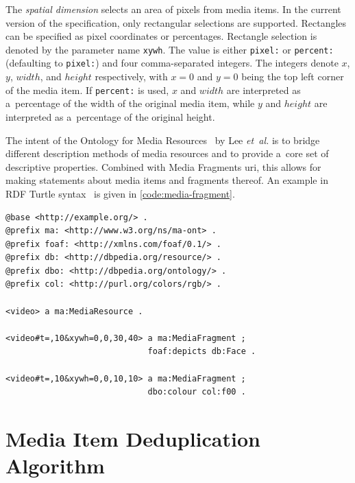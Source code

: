 \documentclass{article}
\begin{document}
The \emph{spatial dimension} selects an area of pixels from media items.
In the current version of the specification,
only rectangular selections are supported.
Rectangles can be specified as pixel coordinates or percentages.
Rectangle selection is denoted by the parameter name \texttt{xywh}.
The value is either \texttt{pixel:} or \texttt{percent:}
(defaulting to \texttt{pixel:}) and four comma-separated integers.
The integers denote $ x $, $ y $, $ width $, and $ height $ respectively,
with $ x = 0 $ and $ y = 0 $ being the top left corner of the media item.
If \texttt{percent:} is used,
$ x $ and $ width $ are interpreted as a~percentage
of the width of the original media item,
while $ y $ and $ height $ are interpreted as a~percentage
of the original height.

The intent of the Ontology for Media Resources~\cite{lee2012mediaontology}
by Lee \emph{et~al.} is to bridge different description methods of media resources
and to provide a~core set of descriptive properties.
Combined with Media Fragments {\sc uri},
this allows for making statements about media items and fragments thereof.
An example in RDF Turtle syntax~\cite{prudhommeaux2013turtle}
is given in \autoref{code:media-fragment}.

\begin{lstlisting}[caption={Description of two 10~sec long media fragments:
  \textit{(i)}~a~tile of dimensions $ 30 \times 40 $ pixels
  starting at pixel coordinates $ (0, 0) $
  that contains a~face; and
  \textit{(ii)}~a~tile of dimensions $ 10 \times 10 $ pixels
  starting at pixel coordinates $ (0, 0) $ of red color},
  label=code:media-fragment, float=t!]
@base <http://example.org/> .
@prefix ma: <http://www.w3.org/ns/ma-ont> .
@prefix foaf: <http://xmlns.com/foaf/0.1/> .
@prefix db: <http://dbpedia.org/resource/> .
@prefix dbo: <http://dbpedia.org/ontology/> .
@prefix col: <http://purl.org/colors/rgb/> .

<video> a ma:MediaResource .

<video#t=,10&xywh=0,0,30,40> a ma:MediaFragment ;
                             foaf:depicts db:Face .
                             
<video#t=,10&xywh=0,0,10,10> a ma:MediaFragment ;
                             dbo:colour col:f00 .
\end{lstlisting}

\section{Media Item Deduplication Algorithm}
\label{sec:media-item-deduplication-algorithm}
\end{document}
